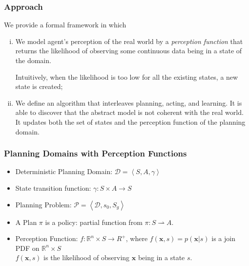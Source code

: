 \documentclass{beamer}
\def\R{\mathbb{R}}
\def\bx{\pmb{x}}
\def\PD{\mathcal{D}}
\def\PP{\mathcal{P}}
\begin{document}
\begin{frame}

\frametitle{Approach}
 
We provide a formal framework in which
\begin{enumerate}[(i)]
  \item    We model agent's perception of the real world by a
{\color {red} 
 \emph{perception function}} that returns {\color {red} the likelihood of observing some continuous data being in a state} of the domain.

Intuitively, when the likelihood is too low for all
the existing states, a new state is created;
\pause
\item We define an {\color {red} algorithm that interleaves planning, acting, and learning}. 
It is able to discover that the abstract model is not
coherent with the real world.  
It {\color {red} updates} both the set of {\color {red} states} and the {\color {red} perception function} of the
planning domain.
\end{enumerate}  
\end{frame}

\begin{frame}
\frametitle{Planning Domains with  Perception Functions}

\begin{itemize}
\item 
Deterministic Planning Domain: $\PD=\left<S,A,\gamma\right>$
\item 
State transition function: $\gamma: S \times A \rightarrow S$
\item
Planning Problem: $\PP= \left<\PD,s_0,S_g\right>$
\item
A Plan $\pi$ is a policy:
partial function from $\pi: S  \rightharpoonup A$.  
\pause
\item
{\color {red} Perception Function:  $f:\R^n\times S\rightarrow R^+$}, where $f(\bx,s) = p(\bx|s)$ is a join PDF on $\R^n\times S$\\
{\color {red} $f(\bx,s)$ is the likelihood of observing $\bx$ being in a state
$s$.}
\end{itemize}  

\end{frame}
\end{document}
